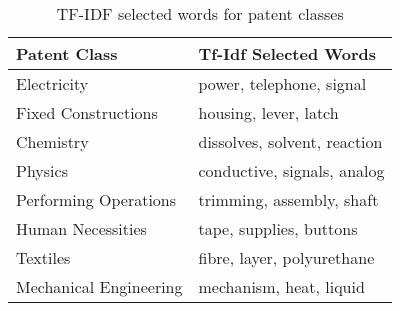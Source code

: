\begin{table}[ht]
\centering
\begin{tabular}{ll}

Patent Class                                & Tf-Idf Selected Words        \\ \hline
\multicolumn{1}{l|}{Electricity}            & power, telephone, signal     \\
\multicolumn{1}{l|}{Fixed Constructions}    & housing, lever, latch        \\
\multicolumn{1}{l|}{Chemistry}              & dissolves, solvent, reaction \\
\multicolumn{1}{l|}{Physics}                & conductive, signals, analog  \\
\multicolumn{1}{l|}{Performing Operations}  & trimming, assembly, shaft    \\
\multicolumn{1}{l|}{Human Necessities}      & tape, supplies, buttons      \\
\multicolumn{1}{l|}{Textiles}               & fibre, layer, polyurethane   \\
\multicolumn{1}{l|}{Mechanical Engineering} & mechanism, heat, liquid     
\end{tabular}
\caption{TF-IDF selected words for patent classes}
\label{tab:qual_analysis}
\end{table}
